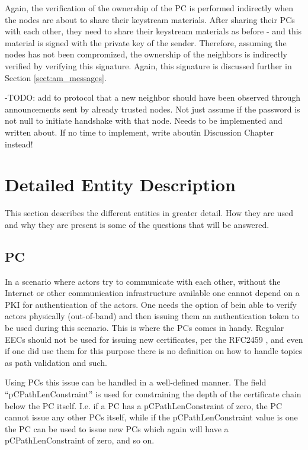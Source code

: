 Again, the verification of the ownership of the \ac{PC} is performed indirectly
when the nodes are about to share their keystream materials. After sharing their
\acp{PC} with each other, they need to share their keystream materials as before
- and this material is signed with the private key of the sender. Therefore,
assuming the nodes has not been compromized, the ownership of the neighbors is
indirectly verified by verifying this signature. Again, this signature is
discussed further in Section \ref{sect:am_messages}.

-TODO: add to protocol that a new neighbor should have been observed through
announcements sent by already trusted nodes. Not just assume if the password is
not null to initiate handshake with that node. Needs to be implemented and
written about. If no time to implement, write aboutin Discussion Chapter
instead!

\section{Detailed Entity Description}
This section describes the different entities in greater detail. How they are
used and why they are present is some of the questions that will be answered.

\subsection{\acf{PC}}
In a scenario where actors try to communicate with each other, without the
Internet or other communication infrastructure available one cannot depend on a
\ac{PKI} for authentication of the actors. One needs the option of bein able to
verify actors physically (out-of-band) and then issuing them an authentication
token to be used during this scenario. This is where the \aclp{PC} comes in
handy. Regular \acp{EEC} should not be used for issuing new certificates, per
the RFC2459 \cite{rfc2459}, and even if one did use them for this purpose there
is no definition on how to handle topics as path validation and such.

Using \acp{PC} this issue can be handled in a well-defined manner. The field
``pCPathLenConstraint'' is used for constraining the depth of the certificate
chain below the \ac{PC} itself. I.e. if a \ac{PC} has a pCPathLenConstraint of
zero, the \ac{PC} cannot issue any other \acp{PC} itself, while if the 
pCPathLenConstraint value is one the \ac{PC} can be used to issue new \acp{PC}
which again will have a pCPathLenConstraint of zero, and so on.

